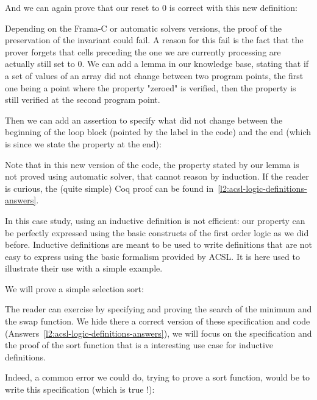 And we can again prove that our reset to 0 is correct with this new
definition:


Depending on the Frama-C or automatic solvers versions, the proof of the
preservation of the invariant could fail. A reason for this fail is the fact that
the prover forgets that cells preceding the one we are currently processing
are actually still set to 0. We can add a lemma in our knowledge base, stating
that if a set of values of an array did not change between two program points,
the first one being a point where the property "zeroed" is verified, then the
property is still verified at the second program point.




Then we can add an assertion to specify what did not change between the
beginning of the loop block (pointed by the label  in the code)
and the end (which is  since we state the property at the end):




Note that in this new version of the code, the property stated by our lemma is
not proved using automatic solver, that cannot reason by induction. If the
reader is curious, the (quite simple) Coq proof can be found
in~\ref{l2:acsl-logic-definitions-answers}.


In this case study, using an inductive definition is not efficient: our
property can be perfectly expressed using the basic constructs of the first
order logic as we did before. Inductive definitions are meant to be used to
write definitions that are not easy to express using the basic formalism
provided by ACSL. It is here used to illustrate their use with a simple
example.


We will prove a simple selection sort:




The reader can exercise by specifying and proving the search of the minimum and
the swap function. We hide there a correct version of these specification and
code (Answers~\ref{l2:acsl-logic-definitions-answers}), we will focus on the
specification and the proof of the sort function that is a interesting use case
for inductive definitions.

Indeed, a common error we could do, trying to prove a sort function, would
be to write this specification (which is true !):


